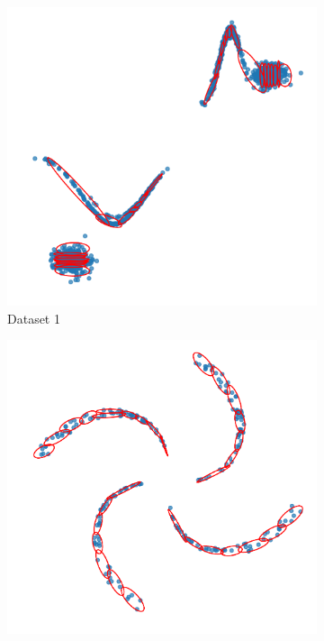 \documentclass[10pt]{article}
\begin{document}
\begin{figure}[H]
    \begin{subfigure}{0.32\textwidth}
        \centering
        \includegraphics[width=\textwidth]{D1_data-covs}
        \caption{Dataset 1}
    \end{subfigure}
    \begin{subfigure}{0.33\textwidth}
        \centering
        \includegraphics[width=\textwidth]{D2_data-covs}

\end{subfigure}
\end{figure}
\end{document}
